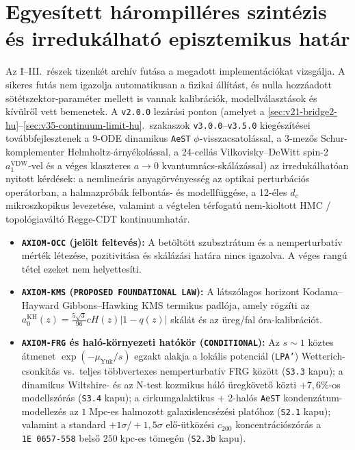 \documentclass[11pt,a4paper]{article}
\begin{document}
\section{Egyesített hárompilléres szintézis és irredukálható episztemikus határ}
\label{sec:step3-synthesis-hu}
Az I--III.~részek tizenkét archív futása a megadott implementációkat vizsgálja. A sikeres futás nem igazolja automatikusan a fizikai állítást, és nulla hozzáadott sötétszektor-paraméter mellett is vannak kalibrációk, modellválasztások és kívülről vett bemenetek. A \texttt{v2.0.0} lezárási ponton (amelyet a \ref{sec:v21-bridge2-hu}--\ref{sec:v35-continuum-limit-hu}.~szakaszok \texttt{v3.0.0}--\texttt{v3.5.0} kiegészítései továbbfejlesztenek a 9-ODE dinamikus \texttt{AeST} $\phi$-visszacsatolással, a 3-mezős Schur-komplementer Helmholtz-árnyékolással, a 24-cellás Vilkovisky--DeWitt spin-2 $a_1^{\mathrm{VDW}}$-vel és a véges klaszteres $a\to 0$ kvantumrács-skálázással) az irredukálhatóan nyitott kérdések: a nemlineáris anyagörvényesség az optikai perturbációs operátorban, a halmazpróbák felbontás- és modellfüggése, a 12-éles $d_c$ mikroszkopikus levezetése, valamint a végtelen térfogatú nem-kioltott HMC / topológiaváltó Regge-CDT kontinuumhatár.
\begin{itemize}
    \item \textbf{\texttt{AXIOM-OCC} (jelölt feltevés):} A betöltött szubsztrátum és a nemperturbatív mérték létezése, pozitivitása és skálázási határa nincs igazolva. A véges rangú tétel ezeket nem helyettesíti.
    \item \textbf{\texttt{AXIOM-KMS} (\texttt{PROPOSED FOUNDATIONAL LAW}):} A látszólagos horizont Kodama--Hayward Gibbons--Hawking KMS termikus padlója, amely rögzíti az $a_0^{\mathrm{KH}}(z) = \frac{5\sqrt{3}}{96}c H(z)|1 - q(z)|$ skálát és az üreg/fal óra-kalibrációt.
    \item \textbf{\texttt{AXIOM-FRG} és haló-környezeti hatókör (\texttt{CONDITIONAL}):} Az $s \sim 1$ köztes átmenet $\exp(-\mu_{\mathrm{Yuk}}/s)$ egzakt alakja a lokális potenciál (\texttt{LPA'}) Wetterich-csonkítás vs.\ teljes többvertexes nemperturbatív FRG között (\texttt{S3.3} kapu); a dinamikus Wiltshire- és az N-test kozmikus háló üregkövető közti $+7{,}6\%$-os modellszórás (\texttt{S3.4} kapu); a cirkumgalaktikus + 2-halós \texttt{AeST} kondenzátum-modellezés az $1\;\mathrm{Mpc}$-es halmozott galaxislencsézési platóhoz (\texttt{S2.1} kapu); valamint a standard $+1\sigma/+1{,}5\sigma$ elő-ütközési $c_{200}$ koncentrációszórás a \texttt{1E~0657-558} belső $250\;\mathrm{kpc}$-es tömegén (\texttt{S2.3b} kapu).
\end{itemize}
\end{document}
